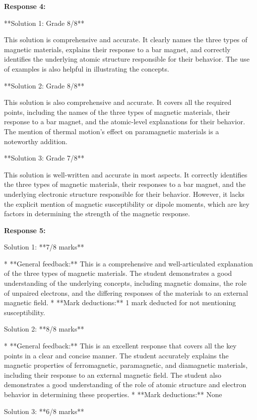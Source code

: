 \documentclass[a4paper,11pt]{article}
\begin{document}
\textbf{Response 4:}

**Solution 1: Grade 8/8**

This solution is comprehensive and accurate. It clearly names the three types of magnetic materials, explains their response to a bar magnet, and correctly identifies the underlying atomic structure responsible for their behavior. The use of examples is also helpful in illustrating the concepts.

**Solution 2: Grade 8/8**

This solution is also comprehensive and accurate. It covers all the required points, including the names of the three types of magnetic materials, their response to a bar magnet, and the atomic-level explanations for their behavior. The mention of thermal motion's effect on paramagnetic materials is a noteworthy addition.

**Solution 3: Grade 7/8**

This solution is well-written and accurate in most aspects. It correctly identifies the three types of magnetic materials, their responses to a bar magnet, and the underlying electronic structure responsible for their behavior. However, it lacks the explicit mention of magnetic susceptibility or dipole moments, which are key factors in determining the strength of the magnetic response.

\textbf{Response 5:}

Solution 1: **7/8 marks**

* **General feedback:** This is a comprehensive and well-articulated explanation of the three types of magnetic materials. The student demonstrates a good understanding of the underlying concepts, including magnetic domains, the role of unpaired electrons, and the differing responses of the materials to an external magnetic field.
* **Mark deductions:** 1 mark deducted for not mentioning susceptibility.


Solution 2: **8/8 marks**

* **General feedback:** This is an excellent response that covers all the key points in a clear and concise manner. The student accurately explains the magnetic properties of ferromagnetic, paramagnetic, and diamagnetic materials, including their response to an external magnetic field. The student also demonstrates a good understanding of the role of atomic structure and electron behavior in determining these properties.
* **Mark deductions:** None


Solution 3: **6/8 marks**
\end{document}
